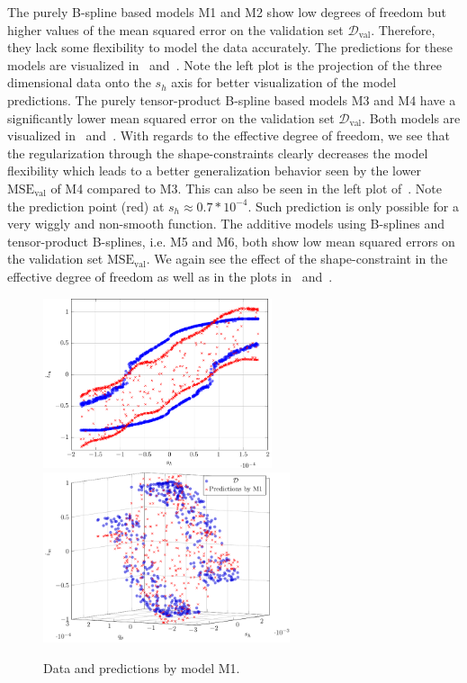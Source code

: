 The purely B-spline based models M1 and M2 show low degrees of freedom but higher values of the mean squared error on the validation set $\mathcal{D}_{\text{val}}$. Therefore, they lack some flexibility to model the data accurately. The predictions for these models are visualized in~ and~. Note the left plot is the projection of the three dimensional data onto the $s_h$ axis for better visualization of the model predictions. The purely tensor-product B-spline based models M3 and M4 have a significantly lower mean squared error on the validation set $\mathcal{D}_{\text{val}}$. Both models are visualized in~ and~. With regards to the effective degree of freedom, we see that the regularization through the shape-constraints clearly decreases the model flexibility which leads to a better generalization behavior seen by the lower $\text{MSE}_{\text{val}}$ of M4 compared to M3. This can also be seen in the left plot of~. Note the prediction point (red) at $s_h \approx 0.7*10^{-4}$. Such prediction is only possible for a very wiggly and non-smooth function. The additive models using B-splines and tensor-product B-splines, i.e. M5 and M6, both show low mean squared errors on the validation set $\text{MSE}_{\text{val}}$. We again see the effect of the shape-constraint in the effective degree of freedom as well as in the plots in~ and~. 

\begin{figure}[H]
	\centering 
	\includegraphics[height=5cm]{graphics/pgfplots/cha6/M1_2d.pdf}\quad
	\includegraphics[height=5cm]{graphics/pgfplots/cha6/M1_3d.pdf}
	\caption{Data and predictions by model M1.}
	\label{fig:bosch-M1}
\end{figure}

